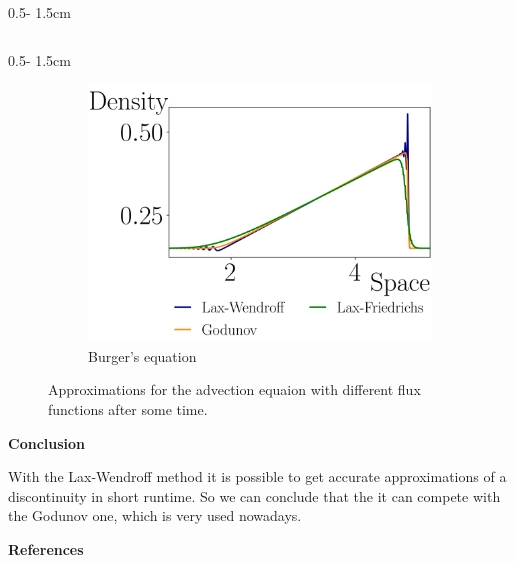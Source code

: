 \documentclass{uibposter}
\begin{document}
\begin{frame}[fragile]
\begin{columns}
\begin{column}{0.5\textwidth - 1.5cm}
\begin{column}{0.5\textwidth - 1.5cm}
\begin{figure}
	\begin{subfigure}{\textwidth}
		\includegraphics{fig/burger_compare.png}
		\caption{Burger's equation}
		\label{img:burger_comprehension}
	\end{subfigure}
	\caption{Approximations for the advection equaion with different flux functions after some time.}
\end{figure}

\textbf{Conclusion}

\vspace{0.5cm}
With the Lax-Wendroff method it is possible to get accurate approximations of a discontinuity in short runtime. So we can conclude that the it can compete with the Godunov one, which is very used nowadays.

    \vspace{0.5cm}
    \textbf{\scriptsize{References}}
    \vspace{0.3cm}
    \nocite{*} 
    
    
    

\end{column}
\end{column}
\end{columns}





\end{frame}
\end{document}
